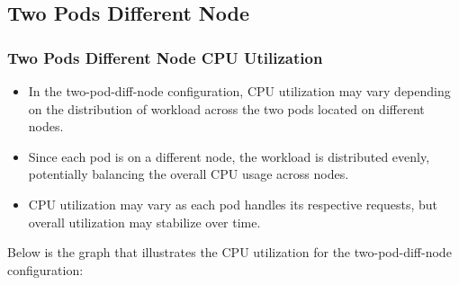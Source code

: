 \subsection{Two Pods Different Node}
\subsubsection{Two Pods Different Node CPU Utilization}
\begin{itemize}
    \item In the two-pod-diff-node configuration, CPU utilization may vary depending on the distribution of workload across the two pods located on different nodes.
    \item Since each pod is on a different node, the workload is distributed evenly, potentially balancing the overall CPU usage across nodes.
    \item CPU utilization may vary as each pod handles its respective requests, but overall utilization may stabilize over time.
\end{itemize}

\noindent Below is the graph that illustrates the CPU utilization for the two-pod-diff-node configuration:

